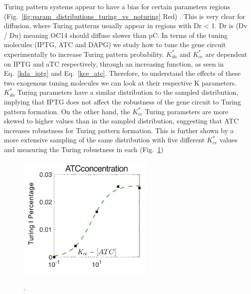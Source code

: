 Turing pattern systems appear to have a bias for certain parameters regions (Fig.~\ref{fig:param_distributions_turing_vs_noturing} Red) .
This is very clear for diffusion, where Turing patterns usually appear in regions with Dr < 1. Dr is (Dv / Du) meaning OC14 should diffuse slower than pC. %
In terms of the tuning molecules (IPTG, ATC and DAPG) we study how to tune the gene circuit experimentally to increase Turing pattern probability.
$K_{da}^*$  and $K_{ce}^*$ are dependent on IPTG and aTC respectively, through an increasing function, as seen in Eq.~\ref{kda_iptg} and Eq.~\ref{kce_atc}.
Therefore, to understand the effects of these two exogenous tuning molecules we can look at their respective K parameters.
$K_{da}^*$ Turing parameters have a similar distribution to the sampled distribution, implying that IPTG does not affect the robustness of the gene circuit to Turing pattern formation.
On the other hand, the $K_{ce}^*$ Turing parameters are more skewed to higher values than in the sampled distribution, suggesting that ATC increases robustness for Turing pattern formation.
This is further shown by a more extensive sampling of the same distribution with five different $K_{ce}^*$ values and measuring the Turing robustness in each (Fig.~\ref{fig:atc_robustness})

\begin{figure}[H] %
    \centering
    \begin{adjustbox}{center}
        \includegraphics[width=0.6\textwidth]{chapters/Chapter 2/atc_robustness} %
    \end{adjustbox}
    \caption{  }. %
    \label{fig:atc_robustness} %
\end{figure}

